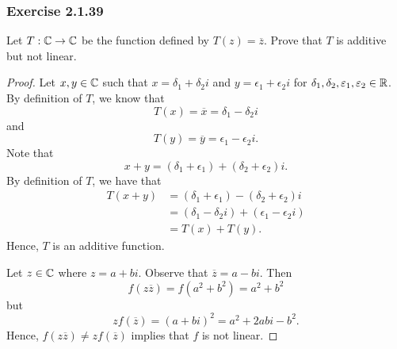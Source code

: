 \subsubsection{Exercise 2.1.39} Let \( T: \mathbb{C} \to \mathbb{C}  \) be the function defined by \( T(z) = \overline{z} \). Prove that \( T  \) is additive but not linear.
\begin{proof}
Let \( x,y \in \mathbb{C}   \) such that \( x = \delta_{1} + \delta_{2}i  \) and \( y = \epsilon_{1} + \epsilon_{2} i  \) for \( \delta_{1}, \delta_{2}, \varepsilon_{1}, \varepsilon_{2} \in \mathbb{R} \). By definition of \( T  \), we know that
\[  T(x) = \overline{x} = \delta _{1} - \delta_{2}i \]
and 
\[ T(y) = \overline{y} = \epsilon_{1} - \epsilon_{2}i. \]
Note that 
\[  x + y = (\delta_{1} + \epsilon _{1}    ) + (\delta_{2} + \epsilon_{2} )i. \]
By definition of \( T  \), we have that
\begin{align*} 
T(x+y) &= (\delta _{1} + \epsilon _{1}) - (\delta _{2} + \epsilon _{2} )i \\
       &= (\delta _{1} - \delta _{2}i ) + (\epsilon _{1} - \epsilon _{2} i) \\
       &= T(x) + T(y).
\end{align*}
Hence, \( T  \) is an additive function.

Let \( z \in \mathbb{C}  \) where \( z = a + bi  \). Observe that \( \overline{z} = a - bi  \). Then 
\[  f(z \overline{z}) = f(a^{2} + b^{2}) = a^{2} + b^{2}  \]
but
\[  z f(\overline{z}) = (a+bi)^{2} = a^{2} + 2abi - b^{2}. \]
Hence, \( f(z \overline{z}) \neq z f(\overline{z}) \) implies that \( f \) is not linear.
\end{proof}

